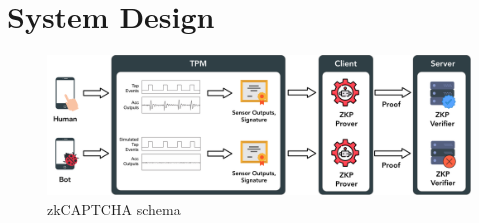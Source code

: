 \section{System Design}

\begin{figure}[t]
  \centering
  \includegraphics[width=\textwidth]{Figures/design.pdf}
  \caption{zkCAPTCHA schema}\label{fig:workflow}
\end{figure} 



